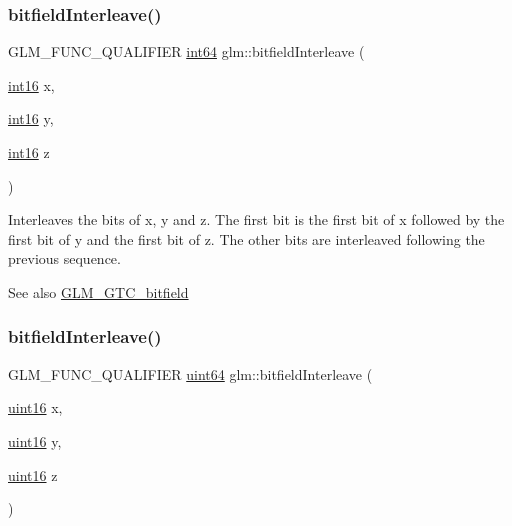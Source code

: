 \subsubsection{\texorpdfstring{bitfield\+Interleave()}{bitfieldInterleave()}\hspace{0.1cm}{\footnotesize\ttfamily [9/16]}}
{\footnotesize\ttfamily G\+L\+M\+\_\+\+F\+U\+N\+C\+\_\+\+Q\+U\+A\+L\+I\+F\+I\+ER \hyperlink{group__gtc__type__precision_ga435d75819cce297cc5fa21bd84ef89a5}{int64} glm\+::bitfield\+Interleave (\begin{DoxyParamCaption}\item[{\hyperlink{group__gtc__type__precision_ga2945a61d12771f8954994fcddf02b021}{int16}}]{x,  }\item[{\hyperlink{group__gtc__type__precision_ga2945a61d12771f8954994fcddf02b021}{int16}}]{y,  }\item[{\hyperlink{group__gtc__type__precision_ga2945a61d12771f8954994fcddf02b021}{int16}}]{z }\end{DoxyParamCaption})}

Interleaves the bits of x, y and z. The first bit is the first bit of x followed by the first bit of y and the first bit of z. The other bits are interleaved following the previous sequence.

\begin{DoxySeeAlso}{See also}
\hyperlink{group__gtc__bitfield}{G\+L\+M\+\_\+\+G\+T\+C\+\_\+bitfield} 
\end{DoxySeeAlso}
\mbox{\label{group__gtc__bitfield_ga3c170e2ec54f2faab5e1c5bb693d718d}} 
\subsubsection{\texorpdfstring{bitfield\+Interleave()}{bitfieldInterleave()}\hspace{0.1cm}{\footnotesize\ttfamily [10/16]}}
{\footnotesize\ttfamily G\+L\+M\+\_\+\+F\+U\+N\+C\+\_\+\+Q\+U\+A\+L\+I\+F\+I\+ER \hyperlink{group__gtc__type__precision_gae3632bf9b37da66233d78930dd06378a}{uint64} glm\+::bitfield\+Interleave (\begin{DoxyParamCaption}\item[{\hyperlink{group__gtc__type__precision_gad8c2939e1fdd8e5828b31d95c52255d5}{uint16}}]{x,  }\item[{\hyperlink{group__gtc__type__precision_gad8c2939e1fdd8e5828b31d95c52255d5}{uint16}}]{y,  }\item[{\hyperlink{group__gtc__type__precision_gad8c2939e1fdd8e5828b31d95c52255d5}{uint16}}]{z }\end{DoxyParamCaption})}


